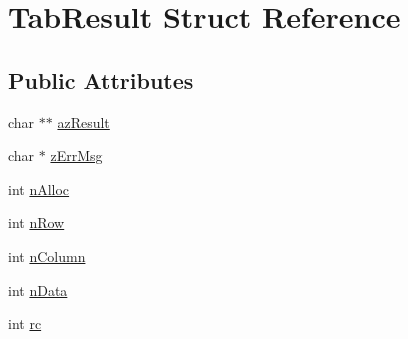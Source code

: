 \hypertarget{struct_tab_result}{\section{Tab\-Result Struct Reference}
\label{struct_tab_result}
}
\subsection*{Public Attributes}
\begin{DoxyCompactItemize}
\item 
char $\ast$$\ast$ \hyperlink{struct_tab_result_a7446a22a7b39c17e447c65ba200490a6}{az\-Result}
\item 
char $\ast$ \hyperlink{struct_tab_result_a6e7104bb622be05f16b6470dbb68a6c7}{z\-Err\-Msg}
\item 
int \hyperlink{struct_tab_result_a6a1d5bc64a1eeef54b56cb2602b663b2}{n\-Alloc}
\item 
int \hyperlink{struct_tab_result_ae803d6f07364c9e03bee8abd13056e1b}{n\-Row}
\item 
int \hyperlink{struct_tab_result_a44237b9ab33cdbca7a5a158470ebcaa3}{n\-Column}
\item 
int \hyperlink{struct_tab_result_a959e8dd3348f76e4cdabad9c89ee62d1}{n\-Data}
\item 
int \hyperlink{struct_tab_result_a44bb015ce660ed3f987e324919d73f4d}{rc}
\end{DoxyCompactItemize}


